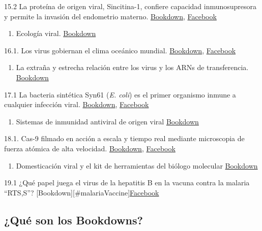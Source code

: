 \documentclass[
  12pt, krantz2,
  spanish,
]{krantz}
\providecommand{\tightlist}{%
  \setlength{\itemsep}{0pt}\setlength{\parskip}{0pt}}
\begin{document}
15.2 La proteína de origen viral, Sincitina-1, confiere capacidad inmunosupresora y permite la invasión del endometrio materno. \href{}{Bookdown}, \href{https://fb.watch/47zn4aTTy9/}{Facebook}

\begin{enumerate}
\def\labelenumi{\arabic{enumi}.}
\setcounter{enumi}{15}
\tightlist
\item
  Ecología viral. \href{}{Bookdown}
\end{enumerate}

16.1. Los virus gobiernan el clima oceánico mundial. \href{}{Bookdown}, \href{https://www.facebook.com/BioViral/videos/2866496176923128/}{Facebook}

\begin{enumerate}
\def\labelenumi{\arabic{enumi}.}
\setcounter{enumi}{16}
\tightlist
\item
  La extraña y estrecha relación entre los virus y los ARNs de transferencia. \href{}{Bookdown}
\end{enumerate}

17.1 La bacteria sintética Syn61 (\emph{E. coli}) es el primer organismo inmune a cualquier infección viral. \href{}{Bookdown}, \href{https://www.facebook.com/BioViral/posts/177374761056508}{Facebook}

\begin{enumerate}
\def\labelenumi{\arabic{enumi}.}
\setcounter{enumi}{17}
\tightlist
\item
  Sistemas de inmunidad antiviral de origen viral \href{}{Bookdown}
\end{enumerate}

18.1. Cas-9 filmado en acción a escala y tiempo real mediante microscopia de fuerza atómica de alta velocidad. \href{}{Bookdown}, \href{https://www.facebook.com/BioViral/posts/191468236313827}{Facebook}

\begin{enumerate}
\def\labelenumi{\arabic{enumi}.}
\setcounter{enumi}{18}
\tightlist
\item
  Domesticación viral y el kit de herramientas del biólogo molecular \href{}{Bookdown}
\end{enumerate}

19.1 ¿Qué papel juega el virus de la hepatitis B en la vacuna contra la malaria ``RTS,S''? {[}Bookdown{]}{[}\#malariaVaccine{]}\href{}{Facebook}

\hypertarget{quuxe9-son-los-bookdowns}{%
\subsection*{¿Qué son los Bookdowns?}\label{quuxe9-son-los-bookdowns}}
\end{document}
